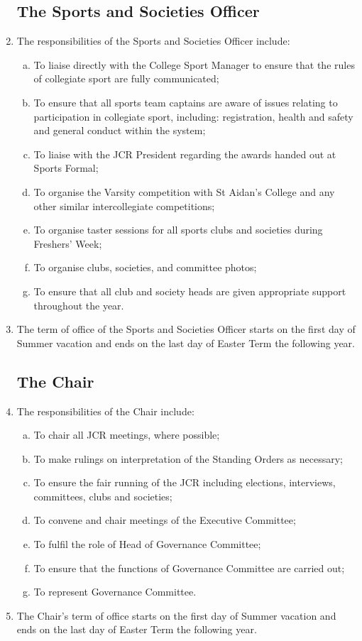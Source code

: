 \documentclass[12pt]{article}
\begin{document}
\begin{enumerate}
    \subsection{The Sports and Societies Officer}
    \item The responsibilities of the Sports and Societies Officer include:
    \begin{enumerate}[(a)]
        \item To liaise directly with the College Sport Manager to ensure that the rules of collegiate sport are fully communicated;
        \item To ensure that all sports team captains are aware of issues relating to participation in collegiate sport, including: registration, health and safety and general conduct within the system;
        \item To liaise with the JCR President regarding the awards handed out at Sports Formal;
        \item To organise the Varsity competition with St Aidan’s College and any other similar intercollegiate competitions;
        \item To organise taster sessions for all sports clubs and societies during Freshers’ Week;
        \item To organise clubs, societies, and committee photos;
        \item To ensure that all club and society heads are given appropriate support throughout the year.
    \end{enumerate}
    \item The term of office of the Sports and Societies Officer starts on the first day of Summer vacation and ends on the last day of Easter Term the following year.
    \subsection{The Chair}
    \item The responsibilities of the Chair include:
    \begin{enumerate}[(a)]
        \item To chair all JCR meetings, where possible;
        \item To make rulings on interpretation of the Standing Orders as necessary;
        \item To ensure the fair running of the JCR including elections, interviews, committees, clubs and societies;
        \item To convene and chair meetings of the Executive Committee;
        \item To fulfil the role of Head of Governance Committee;
        \item To ensure that the functions of Governance Committee are carried out;
        \item To represent Governance Committee.
    \end{enumerate}
    \item The Chair's term of office starts on the first day of Summer vacation and ends on the last day of Easter Term the following year.
\end{enumerate}
\newpage
\end{document}
